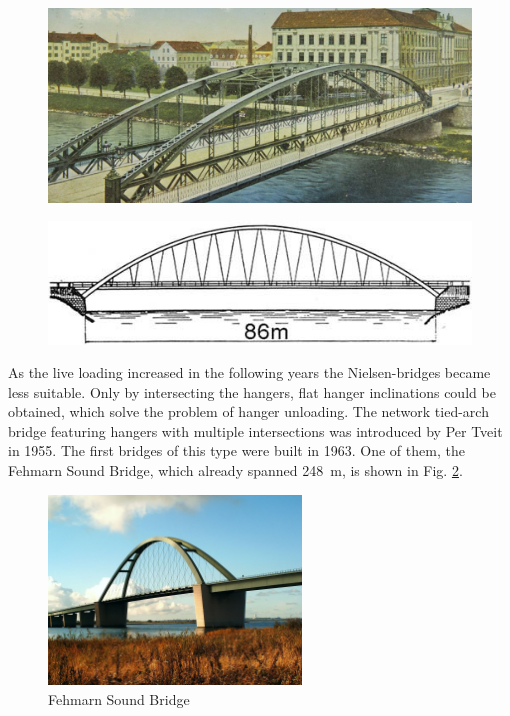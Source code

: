 \begin{figure}[H]
\centering
\begin{minipage}{.5\textwidth}
  \centering
  \includegraphics[width=.9\textwidth]{overleaf/Pictures/langerscher balken.PNG}
  \label{fig:langerscherbalken}
\end{minipage}%
\begin{minipage}{.5\textwidth}
  \centering
  \vspace*{0.6cm}
  \includegraphics[width=.9\textwidth]{overleaf/Pictures/Nielsen bridge.png}
  \vspace*{0.6cm}
  \label{fig:nielsenbridge}
\end{minipage}
\end{figure}

As the live loading increased in the following years the Nielsen-bridges became less suitable. Only by intersecting the hangers, flat hanger inclinations could be obtained, which solve the problem of hanger unloading. The network tied-arch bridge featuring hangers with multiple intersections was introduced by Per Tveit in 1955. The first bridges of this type were built in 1963. One of them, the Fehmarn Sound Bridge, which already spanned \SI{248}{m}, is shown in Fig. \ref{fig:Fehmarnsundbrücke}.

\begin{figure}[H]
    \centering
    \includegraphics[width=0.6\textwidth]{overleaf/Pictures/Fehmarnsund.jpg}
    \caption{Fehmarn Sound Bridge \cite{Fehmarnsund}}
    \label{fig:Fehmarnsundbrücke}
\end{figure}


